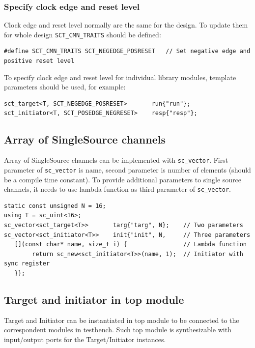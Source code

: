 \subsubsection{Specify clock edge and reset level}

Clock edge and reset level normally are the same for the design. To update them for whole design {\tt SCT\_CMN\_TRAITS} should be defined:
\begin{lstlisting}[style=mycpp]
#define SCT_CMN_TRAITS SCT_NEGEDGE_POSRESET   // Set negative edge and positive reset level
\end{lstlisting}

To specify clock edge and reset level for individual library modules, template parameters should be used, for example:
\begin{lstlisting}[style=mycpp]
sct_target<T, SCT_NEGEDGE_POSRESET>       run{"run"};
sct_initiator<T, SCT_POSEDGE_NEGRESET>    resp{"resp"};
\end{lstlisting}


\subsection{Array of SingleSource channels}

Array of SingleSource channels can be implemented with {\tt sc\_vector}. First parameter of {\tt sc\_vector} is name, second parameter is number of elements (should be a compile time constant). To provide additional parameters to single source channels, it needs to use lambda function as third parameter of {\tt sc\_vector}.

\begin{lstlisting}[style=mycpp]
static const unsigned N = 16;
using T = sc_uint<16>;
sc_vector<sct_target<T>>       targ{"targ", N};    // Two parameters 
sc_vector<sct_initiator<T>>    init{"init", N,     // Three parameters
   [](const char* name, size_t i) {                // Lambda function         
        return sc_new<sct_initiator<T>>(name, 1);  // Initiator with sync register
   }}; 
\end{lstlisting}

\subsection{Target and initiator in top module}

Target and Initiator can be instantiated in top module to be connected to the correspondent modules in testbench. Such top module is synthesizable with input/output ports for the Target/Initiator instances.

